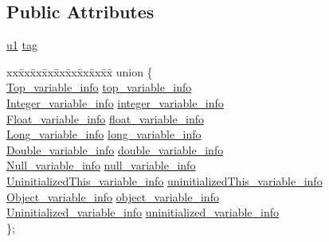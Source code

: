 \subsection*{Public Attributes}
\begin{DoxyCompactItemize}
\item 
\hyperlink{structures_8h_a64f8055b64cf2a4c299c841130c5c938}{u1} \hyperlink{structverification__type__info_aeb9c72b398b4d3ce0863a916f973b05c}{tag}
\item 
\begin{tabbing}
xx\=xx\=xx\=xx\=xx\=xx\=xx\=xx\=xx\=\kill
union \{\\
\>\hyperlink{structTop__variable__info}{Top\_variable\_info} \hyperlink{structverification__type__info_aa9c08dabdcc9eb9cd6887ffc1b7acdb0}{top\_variable\_info}\\
\>\hyperlink{structInteger__variable__info}{Integer\_variable\_info} \hyperlink{structverification__type__info_aa0eb61689487e7851038e8e0ba37a6b6}{integer\_variable\_info}\\
\>\hyperlink{structFloat__variable__info}{Float\_variable\_info} \hyperlink{structverification__type__info_a73db385fdde1fdd46b6ff6386bf28320}{float\_variable\_info}\\
\>\hyperlink{structLong__variable__info}{Long\_variable\_info} \hyperlink{structverification__type__info_a2d890836853a27c0f4bff1b135b3d844}{long\_variable\_info}\\
\>\hyperlink{structDouble__variable__info}{Double\_variable\_info} \hyperlink{structverification__type__info_ac01c6db2b8dd5bfe47a98a2ec2528448}{double\_variable\_info}\\
\>\hyperlink{structNull__variable__info}{Null\_variable\_info} \hyperlink{structverification__type__info_a1f4205281e4346364160c3929783befc}{null\_variable\_info}\\
\>\hyperlink{structUninitializedThis__variable__info}{UninitializedThis\_variable\_info} \hyperlink{structverification__type__info_a40830fd30b55a46a26d9c209bba7b3a8}{uninitializedThis\_variable\_info}\\
\>\hyperlink{structObject__variable__info}{Object\_variable\_info} \hyperlink{structverification__type__info_a7efcdeee31cb5c174267bf13a7386f31}{object\_variable\_info}\\
\>\hyperlink{structUninitialized__variable__info}{Uninitialized\_variable\_info} \hyperlink{structverification__type__info_a036f3ae811e853852803f816c0d69933}{uninitialized\_variable\_info}\\
\}; \\

\end{tabbing}\end{DoxyCompactItemize}


